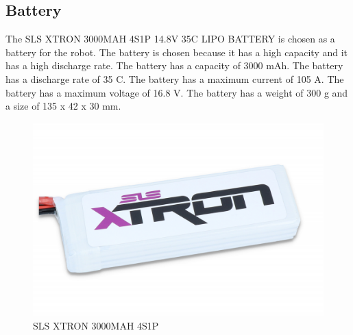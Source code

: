 \subsection{Battery}
The SLS XTRON 3000MAH 4S1P 14.8V 35C LIPO BATTERY is chosen as a battery for the robot. The battery is chosen because it has a high capacity and it has a high discharge rate. The battery has a capacity of 3000 mAh. The battery has a discharge rate of 35 C. The battery has a maximum current of 105 A. The battery has a maximum voltage of 16.8 V. The battery has a weight of 300 g and a size of 135 x 42 x 30 mm.
\begin{figure}[h]
	\centering
	\includegraphics[width=0.5\linewidth]{SLS_XTRON_3000MAH_4S1P}
	\caption[SLS XTRON 3000MAH 4S1P]{SLS XTRON 3000MAH 4S1P}
	\label{fig:SLS_XTRON_3000MAH_4S1P}
\end{figure}


